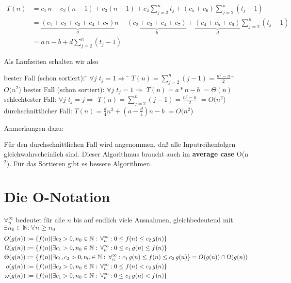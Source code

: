 \documentclass{scrreprt}%
\theoremstyle{break}
\begin{document}
\begin{align*}
  T(n) &= c_1\,n + c_2(n-1) + c_3(n-1) + c_4\sum_{j=2}^{n}t_j
     + (c_5+c_6)\sum_{j=2}^{n}(t_j-1)\\
  &=\underbrace{(c_1+c_2+c_3+c_4+c_7)}_{a}n -
     \underbrace{(c_2+c_3+c_4+c_7)}_{b} +
     \underbrace{(c_4+c_5+c_6)}_{d}\sum_{j=2}^{n}(t_j-1)\\
  &=  a\,n-b+d\sum_{j=2}^{n}(t_j-1)
\end{align*}

Als Laufzeiten erhalten wir also
\begin{tabbing}
bester Fall (schon sortiert): \= $ \forall j \, \, t_j=1 \Rightarrow$ \= $T(n)=\sum_{j=2}^{n}(j-1)= \frac {n^2-n}{2} \,$ \= $O(n^2$) \kill
bester Fall (schon sortiert): \> $ \forall j \, \, t_j=1 \Rightarrow$ \> $T(n)=a*n-b$ \> $=\Theta(n)$ \\ 
schlechtester Fall: \> $ \forall j \, \, t_j=j \Rightarrow$ \> $T(n)=\sum_{j=2}^{n}(j-1)= \frac {n^2-n}{2}$ \> $=O(n^2$)\\
durchschnittlicher Fall: \> \> $T(n)=\frac{d}{4}n^2+(a-\frac{d}{4})n-b$ \> $=O(n^2$)
\end{tabbing}

\noindent Anmerkungen dazu:

Für den durchschnittlichen Fall wird angenommen, daß alle
Inputreihenfolgen gleichwahrscheinlich sind.
Dieser Algorithmus braucht auch im \textbf{average case} O(n$^2)$. Für das Sortieren gibt es
bessere Algorithmen.

\section{Die O-Notation}
$\forall_n^\infty$ bedeutet für alle $n$ bis auf endlich viele
Ausnahmen, gleichbedeutend mit $\exists n_0 \in \mathbb{N}: \forall n\geq n_0$
\begin{align*}
  O(g(n)) &:= \{ f(n) | \exists c_2 > 0, n_0 \in \mathbb{N}:\:
    \forall_n^\infty: 0\leq f(n)\leq c_2\,g(n)\}\\
  \Omega(g(n)) &:= \{ f(n) | \exists{}c_1 > 0, n_0 \in  \mathbb{N}:\:
    \forall_n^\infty: 0\leq c_1\,g(n)\leq f(n) 
    \} \\
  \Theta(g(n)) &:= \{ f(n) | \exists c_1, c_2 > 0, n_0 \in \mathbb{N}:\: 
    \forall_n^\infty: c_1\,g(n)\leq f(n)\leq c_2\,g(n)\} =
    \hfill O(g(n)) \cap \Omega(g(n))\\
o(g(n)) &:= \{ f(n) | \exists c_2 > 0, n_0 \in \mathbb{N}:\:
    \forall_n^\infty: 0\leq f(n)< c_2\,g(n)\}\\
\omega(g(n)) &:= \{ f(n) | \exists{}c_1 > 0, n_0 \in  \mathbb{N}:\:
    \forall_n^\infty: 0\leq c_1\,g(n)< f(n) 
    \}
\end{align*} 
\end{document}
